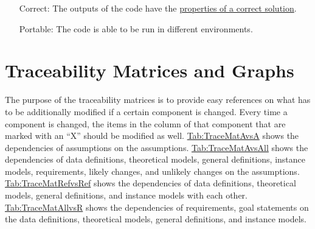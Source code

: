 \documentclass[12pt]{article}
\begin{document}
\begin{itemize}
\item[Correct:\phantomsection\label{correct}]{The outputs of the code have the \hyperref[Sec:CorSolProps]{properties of a correct solution}.}
\item[Portable:\phantomsection\label{portable}]{The code is able to be run in different environments.}
\end{itemize}
\section{Traceability Matrices and Graphs}
\label{Sec:TraceMatrices}
The purpose of the traceability matrices is to provide easy references on what has to be additionally modified if a certain component is changed. Every time a component is changed, the items in the column of that component that are marked with an ``X'' should be modified as well. \hyperref[Table:TraceMatAvsA]{Tab:TraceMatAvsA} shows the dependencies of assumptions on the assumptions. \hyperref[Table:TraceMatAvsAll]{Tab:TraceMatAvsAll} shows the dependencies of data definitions, theoretical models, general definitions, instance models, requirements, likely changes, and unlikely changes on the assumptions. \hyperref[Table:TraceMatRefvsRef]{Tab:TraceMatRefvsRef} shows the dependencies of data definitions, theoretical models, general definitions, and instance models with each other. \hyperref[Table:TraceMatAllvsR]{Tab:TraceMatAllvsR} shows the dependencies of requirements, goal statements on the data definitions, theoretical models, general definitions, and instance models.
\end{document}
